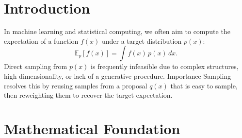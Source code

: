 \documentclass[conference,compsoc]{IEEEtran}
\begin{document}
\begin{abstract}
Importance Sampling (IS) is a fundamental Monte Carlo technique for estimating expectations under intractable target distributions. Instead of sampling directly from the target distribution \(p(x)\), which is often difficult or impossible, IS samples from an easy-to-sample proposal distribution \(q(x)\) and corrects the bias using importance weights. This report introduces the mathematical derivation, core properties, applications in reinforcement learning, and four key experimental validations. Experiments show that IS effectively reduces variance with an optimal proposal, accurately approximates multimodal distributions, avoids tail weight explosion with heavy-tailed proposals, and suffers from weight collapse in high dimensions. Importance Sampling remains an essential tool for off-policy evaluation, Bayesian inference, and rare-event simulation in modern AI.
\end{abstract}





%
\IEEEpeerreviewmaketitle



\section{Introduction}
In machine learning and statistical computing, we often aim to compute the expectation of a function \(f(x)\) under a target distribution \(p(x)\):
\[
\mathbb{E}_{p}[f(x)] = \int f(x)\,p(x)\,dx.
\]
Direct sampling from \(p(x)\) is frequently infeasible due to complex structures, high dimensionality, or lack of a generative procedure. Importance Sampling resolves this by reusing samples from a proposal \(q(x)\) that is easy to sample, then reweighting them to recover the target expectation.

\section{Mathematical Foundation}
\end{document}
